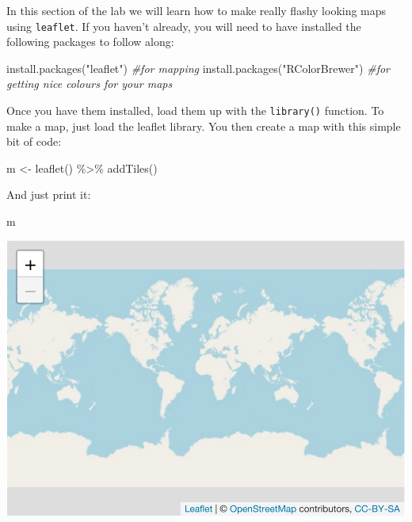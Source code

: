 \documentclass[
]{book}
\newenvironment{Shaded}{\begin{snugshade}}{\end{snugshade}}
\newcommand{\CommentTok}[1]{\textcolor[rgb]{0.56,0.35,0.01}{\textit{#1}}}
\newcommand{\FunctionTok}[1]{\textcolor[rgb]{0.00,0.00,0.00}{#1}}
\newcommand{\NormalTok}[1]{#1}
\newcommand{\OtherTok}[1]{\textcolor[rgb]{0.56,0.35,0.01}{#1}}
\newcommand{\SpecialCharTok}[1]{\textcolor[rgb]{0.00,0.00,0.00}{#1}}
\newcommand{\StringTok}[1]{\textcolor[rgb]{0.31,0.60,0.02}{#1}}
\begin{document}
In this section of the lab we will learn how to make really flashy looking maps using \texttt{leaflet}. If you haven't already, you will need to have installed the following packages to follow along:

\begin{Shaded}
\begin{Highlighting}[]
\FunctionTok{install.packages}\NormalTok{(}\StringTok{"leaflet"}\NormalTok{) }\CommentTok{\#for mapping}
\FunctionTok{install.packages}\NormalTok{(}\StringTok{"RColorBrewer"}\NormalTok{) }\CommentTok{\#for getting nice colours for your maps}
\end{Highlighting}
\end{Shaded}

Once you have them installed, load them up with the \texttt{library()} function. To make a map, just load the leaflet library. You then create a map with this simple bit of code:

\begin{Shaded}
\begin{Highlighting}[]
\NormalTok{m }\OtherTok{\textless{}{-}} \FunctionTok{leaflet}\NormalTok{() }\SpecialCharTok{\%\textgreater{}\%}
  \FunctionTok{addTiles}\NormalTok{()  }
\end{Highlighting}
\end{Shaded}

And just print it:

\begin{Shaded}
\begin{Highlighting}[]
\NormalTok{m  }
\end{Highlighting}
\end{Shaded}

\includegraphics{crime_mapping_files/figure-latex/unnamed-chunk-48-1.pdf}
\end{document}
